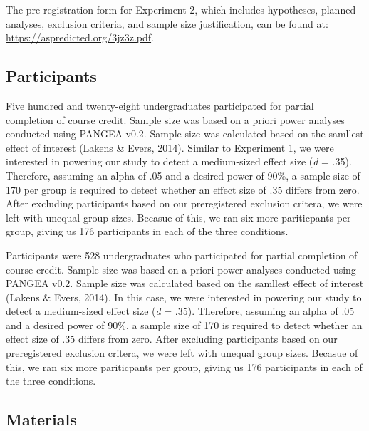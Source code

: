 \documentclass[doc]{apa6}
\begin{document}
The pre-registration form for Experiment 2, which includes hypotheses, planned analyses,
exclusion criteria, and sample size justification, can be found at: \url{https://aspredicted.org/3jz3z.pdf}.

\hypertarget{participants-1}{%
\subsection{Participants}\label{participants-1}}

Five hundred and twenty-eight undergraduates participated for partial completion of course credit. Sample size was based on a priori power analyses conducted using PANGEA v0.2. Sample size was calculated based on the samllest effect of interest (Lakens \& Evers, 2014). Similar to Experiment 1, we were interested in powering our study to detect a medium-sized effect size (\emph{d} = .35). Therefore, assuming an alpha of .05 and a desired power of 90\%, a sample size of 170 per group is required to detect whether an effect size of .35 differs from zero. After excluding participants based on our preregistered exclusion critera, we were left with unequal group sizes. Becasue of this, we ran six more pariticpants per group, giving us 176 participants in each of the three conditions.

Participants were 528 undergraduates who participated for partial completion of course credit. Sample size was based on a priori power analyses conducted using PANGEA v0.2. Sample size was calculated based on the samllest effect of interest (Lakens \& Evers, 2014). In this case, we were interested in powering our study to detect a medium-sized effect size (\emph{d} = .35). Therefore, assuming an alpha of .05 and a desired power of 90\%, a sample size of 170 is required to detect whether an effect size of .35 differs from zero. After excluding participants based on our preregistered exclusion critera, we were left with unequal group sizes. Becasue of this, we ran six more pariticpants per group, giving us 176 participants in each of the three conditions.

\hypertarget{materials-1}{%
\subsection{Materials}\label{materials-1}}
\end{document}

